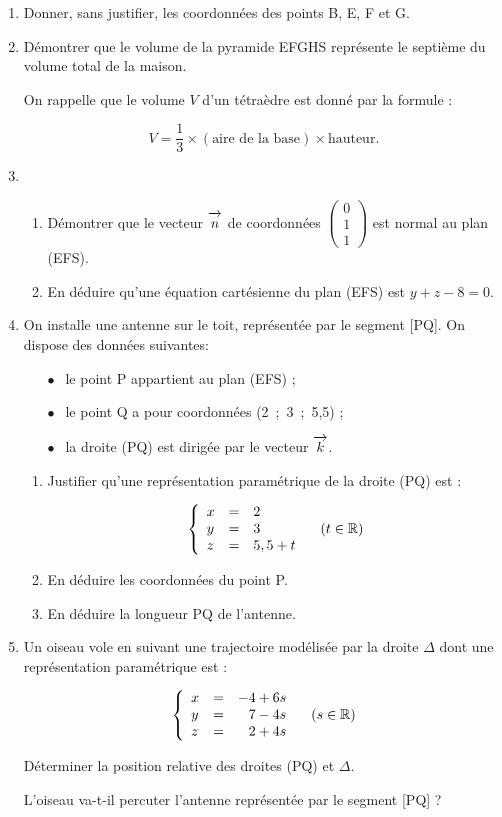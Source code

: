 \documentclass[11pt]{article}
\newcommand{\R}{\mathbb{R}}
\newcommand{\vect}[1]{\overrightarrow{\,\mathstrut#1\,}}
\begin{document}
\begin{enumerate}
\item Donner, sans justifier, les coordonnées des points B, E, F et G.
\item Démontrer que le volume de la pyramide EFGHS représente le septième du volume total de la maison.

On rappelle que le volume $V$ d'un tétraèdre est donné par la formule :

\[V = \dfrac13 \times (\text{aire de la base}) \times  \text{hauteur}.\]
\item 
	\begin{enumerate}
		\item Démontrer que le vecteur $\vect{n}$ de coordonnées $\begin{pmatrix}0\\1\\1\end{pmatrix}$ est normal au plan (EFS).
		\item En déduire qu'une équation cartésienne du plan (EFS) est $y + z - 8 = 0$.
	\end{enumerate}	
\item On installe une antenne sur le toit, représentée par le segment [PQ]. On dispose des données suivantes:

\begin{itemize}
\item[$\bullet~~$] le point P appartient au plan (EFS) ;
\item[$\bullet~~$] le point Q a pour coordonnées (2~;~3~;~5,5) ;
\item[$\bullet~~$] la droite (PQ) est dirigée par le vecteur $\vect{k}$.
\end{itemize}
	\begin{enumerate}
		\item Justifier qu'une représentation paramétrique de la droite (PQ) est :

\[\left\{\begin{array}{l c l}
x &=&2\\
y &=&3\\
z &=& 5,5 + t
\end{array}\right. \quad (t \in \R)\]
		\item En déduire les coordonnées du point P.
		\item En déduire la longueur PQ de l'antenne.
	\end{enumerate}	
\item Un oiseau vole en suivant une trajectoire modélisée par la droite $\Delta$ dont une représentation paramétrique est :

\[\left\{\begin{array}{l c r}
x & =& -4 +6s\\ y &=& 7 - 4s\\z &=& 2 + 4s
\end{array}\right.\quad (s \in \R)\]

Déterminer la position relative des droites (PQ) et $\Delta$.

L'oiseau va-t-il percuter l'antenne représentée par le segment [PQ] ?

\end{enumerate}
\end{document}
